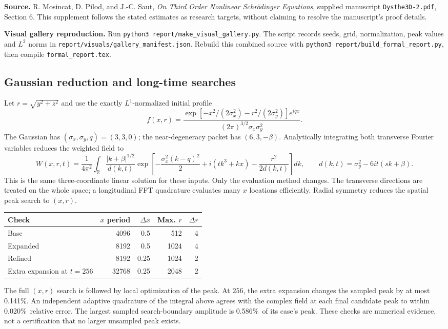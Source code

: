 \documentclass[10pt,letterpaper]{article}
\numberwithin{equation}{section}
\newcommand{\LongDomain}{0.141\%}
\newcommand{\LongQuad}{0.020\%}
\newcommand{\LongEdge}{0.586\%}
\begin{document}
\textbf{Source.} R. Mosincat, D. Pilod, and J.-C. Saut,
\emph{On Third Order Nonlinear Schr\"odinger Equations}, supplied manuscript
\texttt{Dysthe3D-2.pdf}, Section 6. This supplement follows the stated estimates
as research targets, without claiming to resolve the manuscript's proof details.

\textbf{Visual gallery reproduction.} Run \texttt{python3 report/make\_visual\_gallery.py}.
The script records seeds, grid, normalization, peak values and $L^2$ norms in
\texttt{report/visuals/gallery\_manifest.json}. Rebuild this combined source with
\texttt{python3 report/build\_formal\_report.py}, then compile \texttt{formal\_report.tex}.

\subsection{Gaussian reduction and long-time searches}\label{longmethods}
Let $r=\sqrt{y^2+z^2}$ and use the exactly $L^1$-normalized initial profile
\begin{equation}
 f(x,r)=\frac{\exp[-x^2/(2\sigma_x^2)-r^2/(2\sigma_y^2)]e^{iqx}}
 {(2\pi)^{3/2}\sigma_x\sigma_y^2}.
\end{equation}
The Gaussian has $(\sigma_x,\sigma_y,q)=(3,3,0)$; the near-degeneracy packet
has $(6,3,-\beta)$. Analytically integrating both transverse Fourier variables
reduces the weighted field to
\begin{equation}
 W(x,r,t)=\frac1{4\pi^2}\int_{\mathbb R}
 \frac{|k+\beta|^{1/2}}{d(k,t)}
 \exp\!\left[-\frac{\sigma_x^2(k-q)^2}{2}+i(tk^3+kx)
             -\frac{r^2}{2d(k,t)}\right]dk,
 \qquad d(k,t)=\sigma_y^2-6it(sk+\beta).
\end{equation}
This is the same three-coordinate linear solution for these inputs. Only the
evaluation method changes. The transverse directions are treated on the whole
space; a longitudinal FFT quadrature evaluates many $x$ locations efficiently.
Radial symmetry reduces the spatial peak search to $(x,r)$.

\begin{center}\begin{tabular}{lrrrr}\toprule
Check & $x$ period & $\Delta x$ & Max. $r$ & $\Delta r$\\\midrule
Base & 4096 & 0.5 & 512 & 4\\
Expanded & 8192 & 0.5 & 1024 & 4\\
Refined & 8192 & 0.25 & 1024 & 2\\
Extra expansion at $t=256$ & 32768 & 0.25 & 2048 & 2\\\bottomrule
\end{tabular}\end{center}
The full $(x,r)$ search is followed by local optimization of the peak. At $256$,
the extra expansion changes the sampled peak by at most \LongDomain. An independent
adaptive quadrature of the integral above agrees with the complex field at each
final candidate peak to within \LongQuad\ relative error. The largest sampled
search-boundary amplitude is \LongEdge\ of its case's peak. These checks are
numerical evidence, not a certification that no larger unsampled peak exists.
\end{document}
